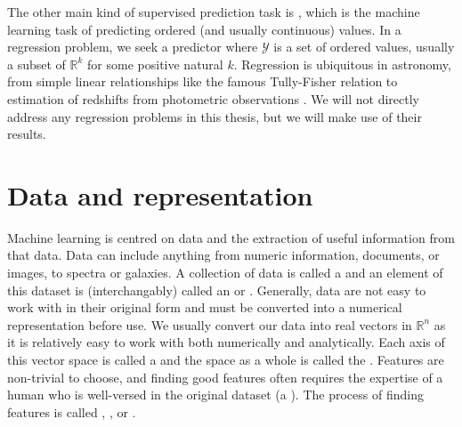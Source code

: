         The other main kind of supervised prediction task is , which is the machine learning task of predicting ordered (and usually continuous) values. In a regression problem, we seek a predictor where $\mathcal Y$ is a set of ordered values, usually a subset of $\mathbb R^k$ for some positive natural $k$. Regression is ubiquitous in astronomy, from simple linear relationships like the famous Tully-Fisher relation \citep{tully_new_1977} to estimation of redshifts from photometric observations \citep[called ; first introduced by]{baum_photoelectric_1962}. We will not directly address any regression problems in this thesis, but we will make use of their results.

\section{Data and representation}
\label{sec:data-and-representation}

    Machine learning is centred on data and the extraction of useful information from that data. Data can include anything from numeric information, documents, or images, to spectra or galaxies. A collection of data is called a  and an element of this dataset is (interchangably) called an  or . Generally, data are not easy to work with in their original form and must be converted into a numerical representation before use. We usually convert our data into real vectors in $\mathbb R^n$ as it is relatively easy to work with both numerically and analytically. Each axis of this vector space is called a  and the space as a whole is called the . Features are non-trivial to choose, and finding good features often requires the expertise of a human who is well-versed in the original dataset (a ). The process of finding features is called , , or .

